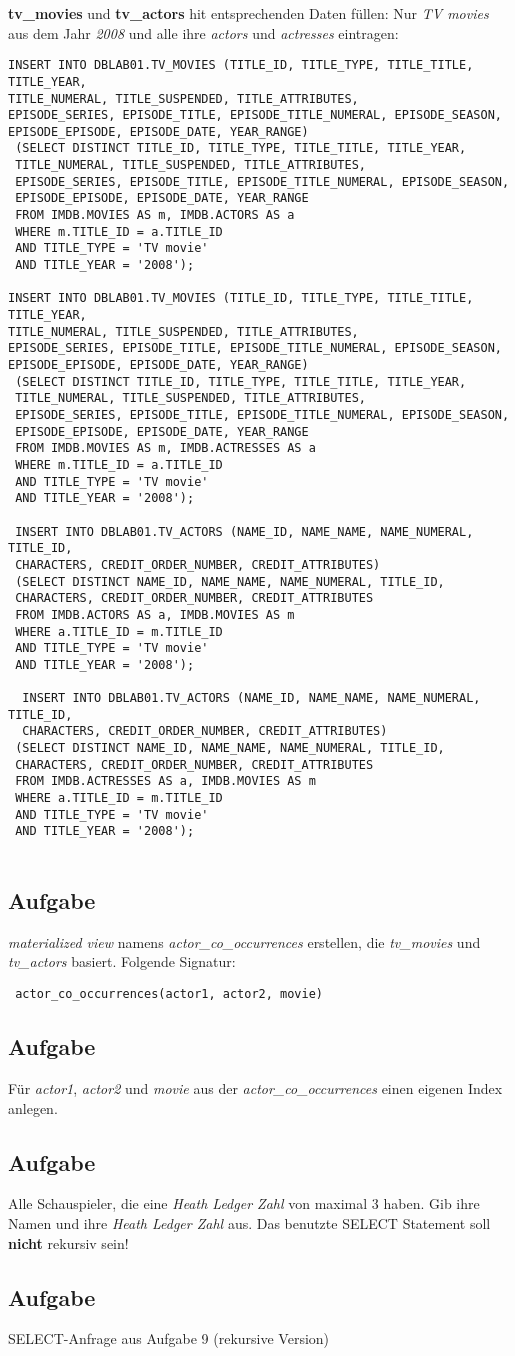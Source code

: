 \documentclass[11pt,a4paper,DIV=9]{scrartcl}
\newcounter{temp}
\newcommand{\aufgabe}[1]{
  \setcounter{temp}{\value{subsection}}
  \setcounter{subsection}{#1}
  \addtocounter{subsection}{-1}
  \subsection{Aufgabe}
  \setcounter{subsection}{\value{temp}}
}
\begin{document}
 \textbf{tv\_movies} und \textbf{tv\_actors} hit entsprechenden Daten f\"ullen:
 Nur \textit{TV movies} aus dem Jahr \textit{2008} und alle ihre \textit{actors} und \textit{actresses} eintragen:
 \begin{lstlisting}
INSERT INTO DBLAB01.TV_MOVIES (TITLE_ID, TITLE_TYPE, TITLE_TITLE, TITLE_YEAR, 
TITLE_NUMERAL, TITLE_SUSPENDED, TITLE_ATTRIBUTES, 
EPISODE_SERIES, EPISODE_TITLE, EPISODE_TITLE_NUMERAL, EPISODE_SEASON, 
EPISODE_EPISODE, EPISODE_DATE, YEAR_RANGE)
 (SELECT DISTINCT TITLE_ID, TITLE_TYPE, TITLE_TITLE, TITLE_YEAR, 
 TITLE_NUMERAL, TITLE_SUSPENDED, TITLE_ATTRIBUTES, 
 EPISODE_SERIES, EPISODE_TITLE, EPISODE_TITLE_NUMERAL, EPISODE_SEASON, 
 EPISODE_EPISODE, EPISODE_DATE, YEAR_RANGE
 FROM IMDB.MOVIES AS m, IMDB.ACTORS AS a
 WHERE m.TITLE_ID = a.TITLE_ID
 AND TITLE_TYPE = 'TV movie'
 AND TITLE_YEAR = '2008');
 
INSERT INTO DBLAB01.TV_MOVIES (TITLE_ID, TITLE_TYPE, TITLE_TITLE, TITLE_YEAR, 
TITLE_NUMERAL, TITLE_SUSPENDED, TITLE_ATTRIBUTES, 
EPISODE_SERIES, EPISODE_TITLE, EPISODE_TITLE_NUMERAL, EPISODE_SEASON, 
EPISODE_EPISODE, EPISODE_DATE, YEAR_RANGE)
 (SELECT DISTINCT TITLE_ID, TITLE_TYPE, TITLE_TITLE, TITLE_YEAR, 
 TITLE_NUMERAL, TITLE_SUSPENDED, TITLE_ATTRIBUTES, 
 EPISODE_SERIES, EPISODE_TITLE, EPISODE_TITLE_NUMERAL, EPISODE_SEASON, 
 EPISODE_EPISODE, EPISODE_DATE, YEAR_RANGE
 FROM IMDB.MOVIES AS m, IMDB.ACTRESSES AS a
 WHERE m.TITLE_ID = a.TITLE_ID
 AND TITLE_TYPE = 'TV movie'
 AND TITLE_YEAR = '2008');
 
 INSERT INTO DBLAB01.TV_ACTORS (NAME_ID, NAME_NAME, NAME_NUMERAL, TITLE_ID, 
 CHARACTERS, CREDIT_ORDER_NUMBER, CREDIT_ATTRIBUTES)
 (SELECT DISTINCT NAME_ID, NAME_NAME, NAME_NUMERAL, TITLE_ID, 
 CHARACTERS, CREDIT_ORDER_NUMBER, CREDIT_ATTRIBUTES
 FROM IMDB.ACTORS AS a, IMDB.MOVIES AS m
 WHERE a.TITLE_ID = m.TITLE_ID
 AND TITLE_TYPE = 'TV movie'
 AND TITLE_YEAR = '2008');
 
  INSERT INTO DBLAB01.TV_ACTORS (NAME_ID, NAME_NAME, NAME_NUMERAL, TITLE_ID, 
  CHARACTERS, CREDIT_ORDER_NUMBER, CREDIT_ATTRIBUTES)
 (SELECT DISTINCT NAME_ID, NAME_NAME, NAME_NUMERAL, TITLE_ID, 
 CHARACTERS, CREDIT_ORDER_NUMBER, CREDIT_ATTRIBUTES
 FROM IMDB.ACTRESSES AS a, IMDB.MOVIES AS m
 WHERE a.TITLE_ID = m.TITLE_ID
 AND TITLE_TYPE = 'TV movie'
 AND TITLE_YEAR = '2008');
 
 \end{lstlisting}
 \aufgabe{7}
 \textit{materialized view} namens \textit{actor\_co\_occurrences} erstellen, die \textit{tv\_movies} und  \textit{tv\_actors} basiert. Folgende Signatur: 
 \begin{lstlisting}
 actor_co_occurrences(actor1, actor2, movie)
 \end{lstlisting}
 \aufgabe{8}
 F\"ur \textit{actor1}, \textit{actor2} und \textit{movie} aus der \textit{actor\_co\_occurrences} einen eigenen Index anlegen.
 \aufgabe{9}
 Alle Schauspieler, die eine \textit{Heath Ledger Zahl} von maximal 3 haben. Gib ihre Namen und ihre \textit{Heath Ledger Zahl} aus. Das benutzte SELECT Statement soll \textbf{nicht} rekursiv sein!
 \aufgabe{10}
 SELECT-Anfrage aus Aufgabe 9 (rekursive Version)
\end{document}
